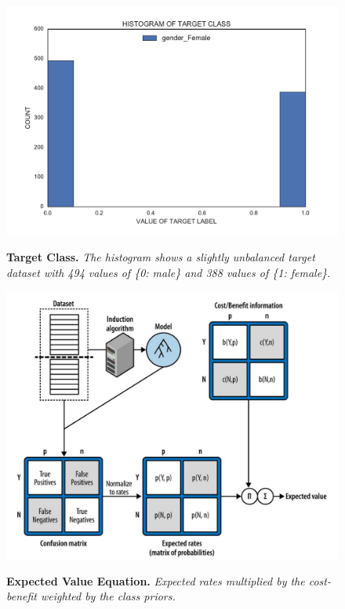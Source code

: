 \begin{figure}[!hbtp]
\centering

    \caption{\textbf{Target Class. }\textit{The histogram shows a slightly unbalanced target dataset with 494 values of \{0: male\} and 388 values of \{1: female\}.}}

    \includegraphics[width=1\textwidth]{figures/targetClass}
    \label{targetClass}
\end{figure}

\begin{figure}[!hbtp]
\centering

    \caption{\textbf{Expected Value Equation. }\textit{Expected rates multiplied by the cost-benefit weighted by the class priors.}}

    \includegraphics[width=1\textwidth]{figures/expectedValueCalculation.png}
    \label{expectedValue}
\end{figure}


